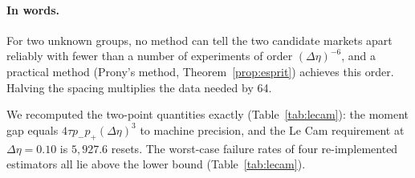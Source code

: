 \paragraph{In words.} For two unknown groups, no method can tell the two candidate markets apart reliably with fewer than a number of experiments of order $(\Delta\eta)^{-6}$, and a practical method (Prony's method, Theorem~\ref{prop:esprit}) achieves this order. Halving the spacing multiplies the data needed by 64.

We recomputed the two-point quantities exactly (Table~\ref{tab:lecam}): the moment gap equals $4\tau p_-p_+(\Delta\eta)^3$ to machine precision, and the Le Cam requirement at $\Delta\eta=0.10$ is $5{,}927.6$ resets. The worst-case failure rates of four re-implemented estimators all lie above the lower bound (Table~\ref{tab:lecam}).

